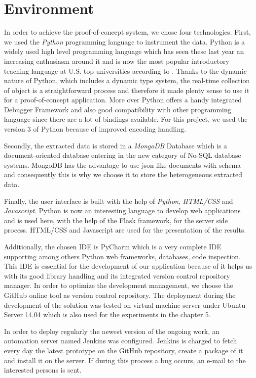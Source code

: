 \section{Environment}
In order to achieve the proof-of-concept system, we chose four technologies. First, we used the \textit{Python} programming language to instrument the data. Python is a widely used high level programming language which has seen these last year an increasing enthusiasm around it and is now the most popular introductory teaching language at U.S. top universities according to \citep{Guo2014}. Thanks to the dynamic nature of Python, which includes a dynamic type system, the real-time collection of object is a straightforward process and therefore it made plenty sense to use it for a proof-of-concept application. More over Python offers a handy integrated Debugger Framework and also good compatibility with other programming language since there are a lot of bindings available. For this project, we used the version 3 of Python because of improved encoding handling.

Secondly, the extracted data is stored in a \textit{MongoDB} Database which is a document-oriented database entering in the new category of No-SQL database systems. MongoDB has the advantage to use \gls{json} like documents with schema and consequently this is why we choose it to store the heterogeneous extracted data.

Finally, the user interface is built with the help of \textit{Python}, \textit{HTML/CSS} and \textit{Javascript}. Python is now an interesting language to develop web applications and is used here, with the help of the Flask framework, for the server side process. HTML/CSS and Javascript are used for the presentation of the results.

Additionally, the chosen IDE is PyCharm which is a very complete IDE supporting among others Python web frameworks, databases, code inspection. This IDE is essential for the development of our application because of it helps us with its good library handling and its integrated version control repository manager. In order to optimize the development management, we choose the GitHub online tool as version control repository. The deployment during the development of the solution was tested on virtual machine server under Ubuntu Server 14.04 which is also used for the experiments in the chapter 5. 

In order to deploy regularly the newest version of the ongoing work, an automation server named Jenkins was configured. Jenkins is charged to fetch every day the latest prototype on the GitHub repository, create a package of it and install it on the server. If during this process a bug occurs, an e-mail to the interested persons is sent.

